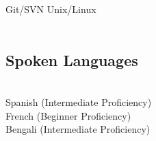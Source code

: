 \documentclass[]{deedy-resume-openfont}
\begin{document}
\begin{minipage}[t]{0.31\textwidth}
Git/SVN \textbullet{} Unix/Linux \\
\\[1\baselineskip]

\sectionsep


\subsection{Spoken Languages}
\\[1\baselineskip]
Spanish (Intermediate Proficiency) \\
French (Beginner Proficiency)\\
Bengali (Intermediate Proficiency)


%
%

\end{minipage}
\hfill
\end{document}

